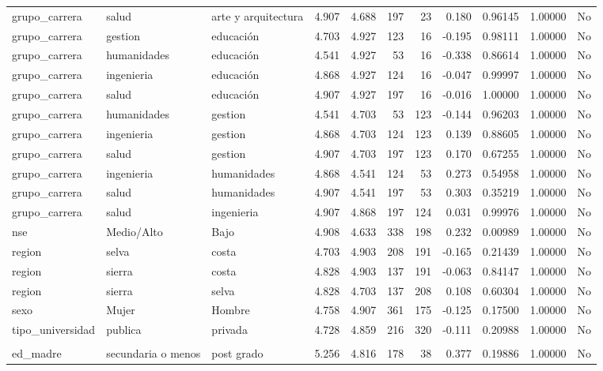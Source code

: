 \documentclass[
  letterpaper,
  DIV=11,
  numbers=noendperiod]{scrartcl}
\begin{document}
\begin{table}
\begin{tabular*}{\linewidth}{@{\extracolsep{\fill}}lllrrrrrrrl}
grupo\_carrera & salud & arte y arquitectura & 4.907 & 4.688 & 197 & 23 & 0.180 & 0.96145 & 1.00000 & No \\ 
grupo\_carrera & gestion & educación & 4.703 & 4.927 & 123 & 16 & -0.195 & 0.98111 & 1.00000 & No \\ 
grupo\_carrera & humanidades & educación & 4.541 & 4.927 & 53 & 16 & -0.338 & 0.86614 & 1.00000 & No \\ 
grupo\_carrera & ingenieria & educación & 4.868 & 4.927 & 124 & 16 & -0.047 & 0.99997 & 1.00000 & No \\ 
grupo\_carrera & salud & educación & 4.907 & 4.927 & 197 & 16 & -0.016 & 1.00000 & 1.00000 & No \\ 
grupo\_carrera & humanidades & gestion & 4.541 & 4.703 & 53 & 123 & -0.144 & 0.96203 & 1.00000 & No \\ 
grupo\_carrera & ingenieria & gestion & 4.868 & 4.703 & 124 & 123 & 0.139 & 0.88605 & 1.00000 & No \\ 
grupo\_carrera & salud & gestion & 4.907 & 4.703 & 197 & 123 & 0.170 & 0.67255 & 1.00000 & No \\ 
grupo\_carrera & ingenieria & humanidades & 4.868 & 4.541 & 124 & 53 & 0.273 & 0.54958 & 1.00000 & No \\ 
grupo\_carrera & salud & humanidades & 4.907 & 4.541 & 197 & 53 & 0.303 & 0.35219 & 1.00000 & No \\ 
grupo\_carrera & salud & ingenieria & 4.907 & 4.868 & 197 & 124 & 0.031 & 0.99976 & 1.00000 & No \\ 
nse & Medio/Alto & Bajo & 4.908 & 4.633 & 338 & 198 & 0.232 & 0.00989 & 1.00000 & No \\ 
region & selva & costa & 4.703 & 4.903 & 208 & 191 & -0.165 & 0.21439 & 1.00000 & No \\ 
region & sierra & costa & 4.828 & 4.903 & 137 & 191 & -0.063 & 0.84147 & 1.00000 & No \\ 
region & sierra & selva & 4.828 & 4.703 & 137 & 208 & 0.108 & 0.60304 & 1.00000 & No \\ 
sexo & Mujer & Hombre & 4.758 & 4.907 & 361 & 175 & -0.125 & 0.17500 & 1.00000 & No \\ 
tipo\_universidad & publica & privada & 4.728 & 4.859 & 216 & 320 & -0.111 & 0.20988 & 1.00000 & No \\ 
\midrule\addlinespace[2.5pt]
\multicolumn{11}{l}{planear} \\[2.5pt] 
\midrule\addlinespace[2.5pt]
ed\_madre & secundaria o menos & post grado & 5.256 & 4.816 & 178 & 38 & 0.377 & 0.19886 & 1.00000 & No \\ 

\end{tabular*}
\end{table}
\end{document}
